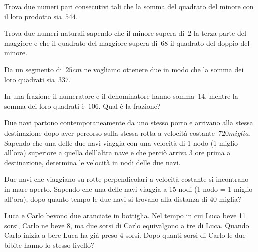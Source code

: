 \begin{multicols}{2}
\begin{esercizio}[\Ast]
 \label{ese:3.139}
Trova due numeri pari consecutivi tali che la somma del quadrato del minore
con il loro prodotto sia~$ 544 $.
\end{esercizio}

\begin{esercizio}[\Ast]
 \label{ese:3.140}
Trova due numeri naturali sapendo che il minore supera di~$ 2 $ la terza parte
del maggiore e che il quadrato del maggiore supera di~$ 68 $ il quadrato del
doppio del minore.
\end{esercizio}

\begin{esercizio}[\Ast]
 \label{ese:3.141}
Da un segmento di~$ 25\unit{cm} $ ne vogliamo ottenere due in modo che la somma dei
loro quadrati sia~$ 337 $.
\end{esercizio}

\begin{esercizio}[\Ast]
 \label{ese:3.142}
In una frazione il numeratore e il denominatore hanno somma~$ 14 $, mentre la
somma dei loro quadrati è~$ 106 $. Qual è la frazione?
\end{esercizio}

\begin{esercizio}[\Ast]
 \label{ese:3.143}
Due navi partono contemporaneamente da uno stesso porto e arrivano alla
stessa destinazione dopo aver percorso sulla stessa rotta a velocità
costante~$ 720\unit{miglia} $. Sapendo che una delle due navi viaggia con una velocità
di 1 nodo (1 miglio all'ora) superiore a quella dell'altra nave e che perciò
arriva 3 ore prima a destinazione, determina le velocità in nodi delle due
navi.
\end{esercizio}

\begin{esercizio}
 \label{ese:3.144}
Due navi che viaggiano su rotte perpendicolari a velocità costante si
incontrano in mare aperto. Sapendo che una delle navi viaggia a 15 nodi (1
nodo = 1 miglio all'ora), dopo quanto tempo le due navi si trovano alla
distanza di 40 miglia?
\end{esercizio}

\begin{esercizio}
 \label{ese:3.145}
Luca e Carlo bevono due aranciate in bottiglia. Nel tempo in cui Luca beve
11 sorsi, Carlo ne beve 8, ma due sorsi di Carlo equivalgono a tre di Luca.
Quando Carlo inizia a bere Luca ha già preso 4 sorsi. Dopo quanti sorsi di
Carlo le due bibite hanno lo stesso livello?
\end{esercizio}


\end{multicols}
